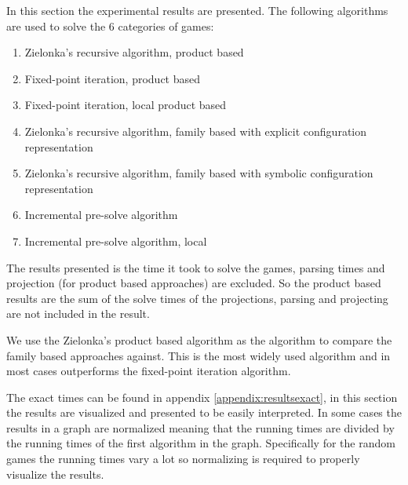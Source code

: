 In this section the experimental results are presented. The following algorithms are used to solve the 6 categories of games:
\begin{enumerate}
	\item Zielonka's recursive algorithm, product based
	\item Fixed-point iteration, product based
	\item Fixed-point iteration, local product based
	\item Zielonka's recursive algorithm, family based with explicit configuration representation
	\item Zielonka's recursive algorithm, family based with symbolic configuration representation
	\item Incremental pre-solve algorithm
	\item Incremental pre-solve algorithm, local
\end{enumerate}

The results presented is the time it took to solve the games, parsing times and projection (for product based approaches) are excluded. So the product based results are the sum of the solve times of the projections, parsing and projecting are not included in the result.

We use the Zielonka's product based algorithm as the algorithm to compare the family based approaches against. This is the most widely used algorithm and in most cases outperforms the fixed-point iteration algorithm.

The exact times can be found in appendix \ref{appendix:resultsexact}, in this section the results are visualized and presented to be easily interpreted. In some cases the results in a graph are normalized meaning that the running times are divided by the running times of the first algorithm in the graph. Specifically for the random games the running times vary a lot so normalizing is required to properly visualize the results.
